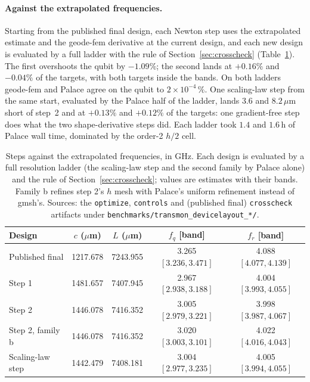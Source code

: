 \documentclass{anvil-paper}
\begin{document}
\paragraph{Against the extrapolated frequencies.}
Starting from the published final design, each Newton step uses the
extrapolated estimate and the geode-fem derivative at the current design,
and each new design is evaluated by a full ladder with the rule of
Section~\ref{sec:crosscheck} (Table~\ref{tab:newton-conv}).
The first overshoots the qubit by $-1.09\%$; the second lands at $+0.16\%$
and $-0.04\%$ of the targets, with both targets inside the bands. On both
ladders geode-fem and Palace agree on the qubit to $2\times10^{-4}\,\%$.
One scaling-law step from the same start, evaluated by the Palace half of
the ladder, lands $3.6$ and $8.2\,\mu$m short of step~2 and at $+0.13\%$
and $+0.12\%$ of the targets: one gradient-free step does what the two
shape-derivative steps did. Each ladder took $1.4$ and $1.6$\,h of Palace
wall time, dominated by the order-2 $h/2$ cell.

\begin{table}[htbp]
  \centering
  \caption{Steps against the extrapolated frequencies, in GHz. Each design
  is evaluated by a full resolution ladder (the scaling-law step and the
  second family by Palace alone) and the rule of
  Section~\ref{sec:crosscheck}; values are estimates with their bands.
  Family b refines step 2's $h$ mesh with Palace's uniform refinement
  instead of gmsh's. Sources: the \texttt{optimize}, \texttt{controls} and
  (published final) \texttt{crosscheck} artifacts under
  \texttt{benchmarks/transmon\_devicelayout\_*/}.}
  \label{tab:newton-conv}
  \footnotesize
  \begin{tabular}{@{}lcccc@{}}
    \toprule
    Design & $c$ ($\mu$m) & $L$ ($\mu$m) & $f_q$ [band] & $f_r$ [band] \\
    \midrule
    Published final & 1217.678 & 7243.955 & 3.265 $[3.236, 3.471]$ & 4.088 $[4.077, 4.139]$ \\
    Step 1 & 1481.657 & 7407.945 & 2.967 $[2.938, 3.188]$ & 4.004 $[3.993, 4.055]$ \\
    Step 2 & 1446.078 & 7416.352 & 3.005 $[2.979, 3.221]$ & 3.998 $[3.987, 4.067]$ \\
    Step 2, family b & 1446.078 & 7416.352 & 3.020 $[3.003, 3.101]$ & 4.022 $[4.016, 4.043]$ \\
    Scaling-law step & 1442.479 & 7408.181 & 3.004 $[2.977, 3.235]$ & 4.005 $[3.994, 4.055]$ \\
    \bottomrule
  \end{tabular}
\end{table}
\end{document}
